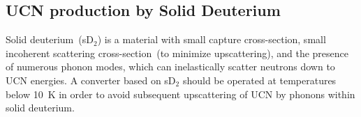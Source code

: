











\subsection{UCN production by Solid Deuterium}
Solid deuterium~(sD$_2$) is a material with small capture
cross-section, small incoherent scattering cross-section~(to minimize
upscattering), and the presence of numerous phonon modes, which can
inelastically scatter neutrons down to UCN energies.  A converter
based on sD$_2$ should be operated at temperatures below 10~K in order
to avoid subsequent upscattering of UCN by phonons within solid
deuterium.

